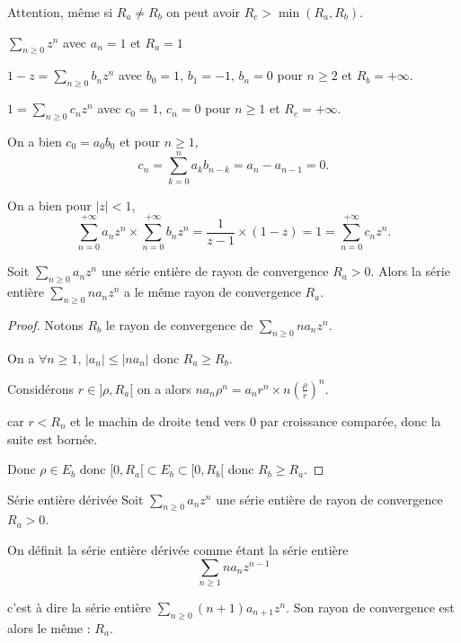 \begin{remarque}
    Attention, même si $R_a \neq R_b$ on peut avoir $R_c > \min(R_a, R_b)$.
\end{remarque}

\begin{exemple}
    $\sum_{n \geqslant 0 } z^n$ avec $a_n = 1$ et $R_a = 1$

    $1 - z = \sum_{n \geqslant 0} b_n z^n$ avec $b_0 = 1, \, b_1 = -1, \, b_n = 0$ pour $n \geqslant 2$ et $R_b = +\infty$.

    $1 = \sum_{n \geqslant 0 } c_n z^n$ avec $c_0 = 1, \, c_n = 0$ pour $n \geqslant 1$ et $R_c = +\infty$.

    On a bien $c_0 = a_0 b_0$ et pour $n \geqslant 1$, 
    \[
        c_n = \sum_{k = 0}^n a_k b_{n - k} = a_n - a_{n - 1} = 0.
    \]

    On a bien pour $|z| < 1$,
    \[
        \sum_{n = 0}^{+\infty} a_n z^n \times \sum_{n = 0 }^{+ \infty } b_n z^n= \frac 1 {z - 1} \times (1 - z) = 1 = \sum_{n = 0}^{+\infty} c_n z^n.
    \]
\end{exemple}


\begin{proposition}{}{}
    Soit $\sum_{n \geqslant 0} a_n z^n$ une série entière de rayon de convergence $R_a > 0$.
    Alors la série entière $\sum_{n \geqslant 0} n a_n z^n$ a le même rayon de convergence $R_a$.
\end{proposition}

\begin{proof}
    Notons $R_b$ le rayon de convergence de $\sum_{n \geqslant 0} n a_n z^n$.

    On a $\forall n \geqslant 1, \, |a_n| \leqslant |n a_n|$ donc $R_a \geqslant R_b$.


    Considérons $r \in ]\rho, R_a[$ on a alors $n a_n \rho^n = a_n r^n \times n \left( \frac \rho r \right)^n$.

    car $r < R_n$ et le machin de droite tend vers 0 par croissance comparée, donc la suite est bornée. 

    Donc $\rho \in E_b$ donc $[0, R_a [ \subset E_b  \subset [0, R_b[$ donc $R_b \geqslant R_a$.
\end{proof}

\begin{definition}{Série entière dérivée}{}
    Soit $\sum_{n \geqslant 0 } a_n z^n$ une série entière de rayon de convergence $R_a > 0$.

    On définit la série entière dérivée comme étant la série entière
    $$\sum_{n \geqslant 1} n a_n z^{ n - 1 }$$

    c'est à dire la série entière $\sum_{n \geqslant 0} (n + 1) a_{n + 1} z^n$. Son rayon de 
    convergence est alors le même : $R_a$. 
\end{definition}

